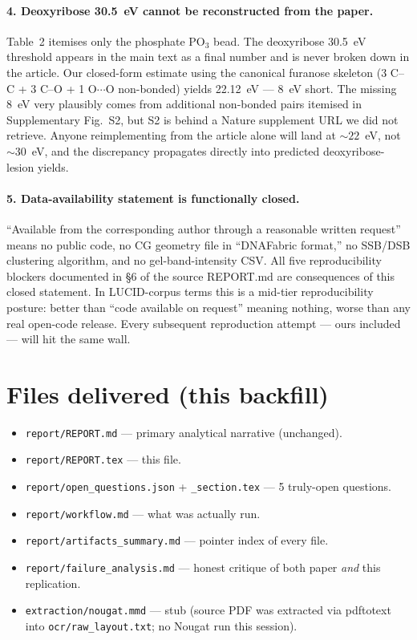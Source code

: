 \documentclass[11pt]{article}
\begin{document}
\paragraph{4. Deoxyribose 30.5~eV cannot be reconstructed from the paper.}
Table~2 itemises only the phosphate PO$_3$ bead. The deoxyribose
30.5~eV threshold appears in the main text as a final number and is
never broken down in the article. Our closed-form estimate using the
canonical furanose skeleton (3 C--C + 3 C--O + 1 O$\cdots$O non-bonded)
yields 22.12~eV --- 8~eV short. The missing 8~eV very plausibly comes
from additional non-bonded pairs itemised in Supplementary Fig.~S2, but
S2 is behind a Nature supplement URL we did not retrieve. Anyone
reimplementing from the article alone will land at $\sim 22$~eV, not
$\sim 30$~eV, and the discrepancy propagates directly into
predicted deoxyribose-lesion yields.

\paragraph{5. Data-availability statement is functionally closed.}
``Available from the corresponding author through a reasonable written
request'' means no public code, no CG geometry file in ``DNAFabric
format,'' no SSB/DSB clustering algorithm, and no gel-band-intensity
CSV. All five reproducibility blockers documented in \S6 of the source
REPORT.md are consequences of this closed statement. In LUCID-corpus
terms this is a mid-tier reproducibility posture: better than
``code available on request'' meaning nothing, worse than any real
open-code release. Every subsequent reproduction attempt --- ours
included --- will hit the same wall.

\section{Files delivered (this backfill)}
\begin{itemize}
  \item \texttt{report/REPORT.md} --- primary analytical narrative (unchanged).
  \item \texttt{report/REPORT.tex} --- this file.
  \item \texttt{report/open\_questions.json} + \texttt{\_section.tex} --- 5 truly-open questions.
  \item \texttt{report/workflow.md} --- what was actually run.
  \item \texttt{report/artifacts\_summary.md} --- pointer index of every file.
  \item \texttt{report/failure\_analysis.md} --- honest critique of both paper \emph{and} this replication.
  \item \texttt{extraction/nougat.mmd} --- stub (source PDF was extracted via pdftotext into \texttt{ocr/raw\_layout.txt}; no Nougat run this session).
\end{itemize}
\end{document}
